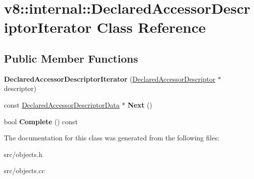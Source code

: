 \hypertarget{classv8_1_1internal_1_1_declared_accessor_descriptor_iterator}{}\section{v8\+:\+:internal\+:\+:Declared\+Accessor\+Descriptor\+Iterator Class Reference}
\label{classv8_1_1internal_1_1_declared_accessor_descriptor_iterator}
\subsection*{Public Member Functions}
\begin{DoxyCompactItemize}
\item 
\hypertarget{classv8_1_1internal_1_1_declared_accessor_descriptor_iterator_a13f9f659dde11b6e0f5188957ec587e1}{}{\bfseries Declared\+Accessor\+Descriptor\+Iterator} (\hyperlink{classv8_1_1internal_1_1_declared_accessor_descriptor}{Declared\+Accessor\+Descriptor} $\ast$descriptor)\label{classv8_1_1internal_1_1_declared_accessor_descriptor_iterator_a13f9f659dde11b6e0f5188957ec587e1}

\item 
\hypertarget{classv8_1_1internal_1_1_declared_accessor_descriptor_iterator_abc49ea16759454a613cd554591fa8169}{}const \hyperlink{structv8_1_1internal_1_1_declared_accessor_descriptor_data}{Declared\+Accessor\+Descriptor\+Data} $\ast$ {\bfseries Next} ()\label{classv8_1_1internal_1_1_declared_accessor_descriptor_iterator_abc49ea16759454a613cd554591fa8169}

\item 
\hypertarget{classv8_1_1internal_1_1_declared_accessor_descriptor_iterator_af5ad95ca159631955cdef3731983554e}{}bool {\bfseries Complete} () const \label{classv8_1_1internal_1_1_declared_accessor_descriptor_iterator_af5ad95ca159631955cdef3731983554e}

\end{DoxyCompactItemize}


The documentation for this class was generated from the following files\+:\begin{DoxyCompactItemize}
\item 
src/objects.\+h\item 
src/objects.\+cc\end{DoxyCompactItemize}
